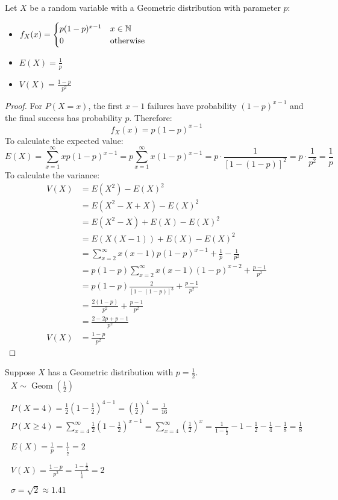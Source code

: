 \documentclass[letterpaper,12pt,fleqn]{article}
\DeclareMathOperator{\geom}{Geom}
\renewcommand{\o}{\sigma}
\begin{document}
\begin{theorem}
  Let \(X\) be a random variable with a Geometric distribution with parameter \(p\):
  \begin{itemize}
  \item \(f_X(x)=\begin{cases}
    p(1-p)^{x-1} & x\in\mathbb{N} \\
    0 & \text{otherwise}
  \end{cases}\)
  \item \(E(X)=\frac{1}{p}\)
  \item \(V(X)=\frac{1-p}{p^2}\)
  \end{itemize}
\end{theorem}

\begin{proof}
  For \(P(X=x)\), the first \(x-1\) failures have probability \((1-p)^{x-1}\) and the final success has probability \(p\).
  Therefore:
  \[f_X(x)=p(1-p)^{x-1}\]
  To calculate the expected value:
  \[E(X)=\sum_{x=1}^{\infty}xp(1-p)^{x-1}=p\sum_{x=1}^{\infty}x(1-p)^{x-1}=p\cdot\frac{1}{[1-(1-p)]^2}=p\cdot\frac{1}{p^2}=
  \frac{1}{p}\]
  To calculate the variance:
  \begin{align*}
    V(X) &= E(X^2)-E(X)^2 \\
    &= E(X^2-X+X)-E(X)^2 \\
    &= E(X^2-X)+E(X)-E(X)^2 \\
    &= E(X(X-1))+E(X)-E(X)^2 \\
    &= \sum_{x=2}^{\infty}x(x-1)p(1-p)^{x-1}+\frac{1}{p}-\frac{1}{p^2} \\
    &= p(1-p)\sum_{x=2}^{\infty}x(x-1)(1-p)^{x-2}+\frac{p-1}{p^2} \\
    &= p(1-p)\frac{2}{[1-(1-p)]^3}+\frac{p-1}{p^2} \\
    &= \frac{2(1-p)}{p^2}+\frac{p-1}{p^2} \\
    &= \frac{2-2p+p-1}{p^2} \\
    V(X) &= \frac{1-p}{p^2}
  \end{align*}
\end{proof}

\begin{example}
  Suppose \(X\) has a Geometric distribution with \(p=\frac{1}{2}\).
  \begin{gather*}
    X\sim\geom\left(\frac{1}{2}\right) \\
    \\
    P(X=4)=\frac{1}{2}\left(1-\frac{1}{2}\right)^{4-1}=\left(\frac{1}{2}\right)^4=\frac{1}{16} \\
    P(X\ge4)=\sum_{x=4}^{\infty}\frac{1}{2}\left(1-\frac{1}{2}\right)^{x-1}=\sum_{x=4}^{\infty}\left(\frac{1}{2}\right)^x=
    \frac{1}{1-\frac{1}{2}}-1-\frac{1}{2}-\frac{1}{4}-\frac{1}{8}=\frac{1}{8}\\
    \\
    E(X)=\frac{1}{p}=\frac{1}{\frac{1}{2}}=2 \\
    \\
    V(X)=\frac{1-p}{p^2}=\frac{1-\frac{1}{2}}{\frac{1}{4}}=2 \\
    \\
    \o=\sqrt{2}\approx1.41
  \end{gather*}
\end{example}
\end{document}
